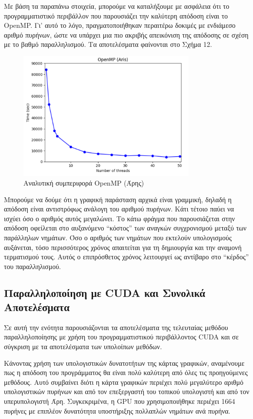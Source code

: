 \documentclass[12pt,a4paper]{article}
\begin{document}
Με βάση τα παραπάνω στοιχεία, μπορούμε να καταλήξουμε με ασφάλεια ότι το προγραμματιστικό περιβάλλον που παρουσιάζει την καλύτερη απόδοση είναι το OpenMP. Γι' αυτό το λόγο, πραγματοποιήθηκαν περαιτέρω δοκιμές με ενδιάμεσο αριθμό πυρήνων, ώστε να υπάρχει μια πιο ακριβής απεικόνιση της απόδοσης σε σχέση με το βαθμό παραλληλισμού. Τα αποτελέσματα φαίνονται στο Σχήμα 12.

\begin{figure}[h!]
\centering
\includegraphics[width=0.8\textwidth]{Figures/omp.png}
\caption{Αναλυτική συμπεριφορά OpenMP (Άρης)}
\end{figure}  

Μπορούμε να δούμε ότι η γραφική παράσταση αρχικά είναι γραμμική, δηλαδή η απόδοση είναι αντιστρόφως ανάλογη του αριθμού πυρήνων. Κάτι τέτοιο παύει να ισχύει όσο ο αριθμός αυτός μεγαλώνει. Το κάτω φράγμα που παρουσιάζεται στην απόδοση οφείλεται στο αυξανόμενο ``κόστος'' των αναγκών συγχρονισμού μεταξύ των παράλληλων νημάτων. Όσο ο αριθμός των νημάτων που εκτελούν υπολογισμούς αυξάνεται, τόσο περισσότερος χρόνος απαιτείται για τη δημιουργία και την αναμονή τερματισμού τους. Αυτός ο επιπρόσθετος χρόνος λειτουργεί ως αντίβαρο στο ``κέρδος'' του παραλληλισμού.

\subsection{Παραλληλοποίηση με CUDA και Συνολικά Αποτελέσματα}

Σε αυτή την ενότητα παρουσιάζονται τα αποτελέσματα της τελευταίας μεθόδου παραλληλοποίησης με χρήση του προγραμματιστικού περιβάλλοντος CUDA και σε σύγκριση με τα αποτελέσματα των υπολοίπων μεθόδων.

Κάνοντας χρήση των υπολογιστικών δυνατοτήτων της κάρτας γραφικών, αναμένουμε πως η απόδοση του προγράμματος θα είναι πολύ καλύτερη από όλες τις προηγούμενες μεθόδους. Αυτό συμβαίνει διότι η κάρτα γραφικών περιέχει πολύ μεγαλύτερο αριθμό υπολογιστικών πυρήνων και από τον επεξεργαστή του τοπικού υπολογιστή και από τον υπερυπολογιστή Άρη. Συγκεκριμένα, η GPU που χρησιμοποιήθηκε περιέχει 1664 πυρήνες με επιπλέον δυνατότητα υποστήριξης πολλαπλών νημάτων ανά πυρήνα.
\end{document}
